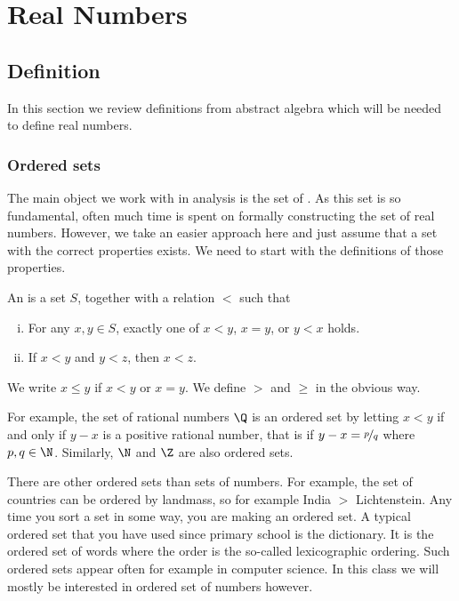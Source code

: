 \documentclass[12pt]{book}
\begin{document}
\chapter{Real Numbers} \label{rn:chapter}


\section{Definition} \label{sec:basicpropsrn}


In this section we review definitions from abstract algebra 
which will be needed to define real numbers.

\subsection*{Ordered sets}

The main object we work with in analysis is the set of
.
As this set is so fundamental, often much time is
spent on formally constructing the set of real numbers.
However, we 
take an easier approach here and just assume that a set with the correct
properties exists.
We need to start with the definitions of those
properties.

\begin{defn}
An \emph{} is a set $S$, together with
a relation $<$ such that
\begin{enumerate}[(i)]
\item For any $x, y \in S$, exactly one of
$x < y$, $x=y$, or $y < x$ holds.
\item If $x < y$ and $y < z$, then $x < z$.
\end{enumerate}
We write $x \leq y$ if $x < y$ or $x=y$.
We define
$>$ and $\geq$ in the obvious way.
\end{defn}


For example, the set of rational numbers $\Q$ is an ordered set by letting
$x < y$ if and only if $y-x$ is a positive rational number, that is
if $y-x = \nicefrac{p}{q}$ where $p,q \in \N$.
Similarly,
$\N$ and $\Z$ are also ordered sets.

There are other ordered sets than sets of numbers.
For example, the set of countries can be ordered by landmass, so for example India $>$ Lichtenstein.
Any time you sort a set in some way, you are making an ordered set.
A typical ordered set that you have used since primary school is the dictionary.
It is the ordered set of words where the order is the so-called lexicographic ordering.
Such ordered sets appear often for example in computer science.
In this class we will mostly be interested in ordered set of numbers however.
\end{document}
